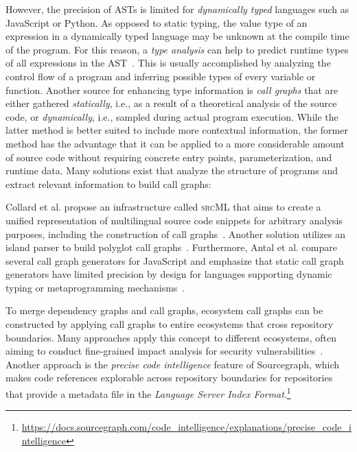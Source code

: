\documentclass[a4paper,twoside]{article}
\newcommand\caps[1]{%
	\textsc{#1}%
}
\begin{document}
However, the precision of ASTs is limited for \emph{dynamically typed} languages such as JavaScript or Python.
As opposed to static typing, the value type of an expression in a dynamically typed language may be unknown at the compile time of the program.
For this reason, a \emph{type analysis} can help to predict runtime types of all expressions in the AST~\cite{jensen2009type}.
This is usually accomplished by analyzing the control flow of a program and inferring possible types of every variable or function.
Another source for enhancing type information is \emph{call graphs} that are either gathered \emph{statically}, i.e., as a result of a theoretical analysis of the source code, or \emph{dynamically}, i.e., sampled during actual program execution.
While the latter method is better suited to include more contextual information, the former method has the advantage that it can be applied to a more considerable amount of source code without requiring concrete entry points, parameterization, and runtime data.
Many solutions exist that analyze the structure of programs and extract relevant information to build call graphs:

Collard et al. propose an infrastructure called \caps{srcML} that aims to create a unified representation of multilingual source code snippets for arbitrary analysis purposes, including the construction of call graphs~\cite{collard2013srcml}.
Another solution utilizes an island parser to build polyglot call graphs~\cite{bogar2018lightweight}.
Furthermore, Antal et al. compare several call graph generators for JavaScript and emphasize that static call graph generators have limited precision by design for languages supporting dynamic typing or metaprogramming mechanisms~\cite{antal2018static}.

To merge dependency graphs and call graphs, ecosystem call graphs can be constructed by applying call graphs to entire ecosystems that cross repository boundaries.
Many approaches apply this concept to different ecosystems, often aiming to conduct fine-grained impact analysis for security vulnerabilities~\cite{hejderup2018software,boldi2020fine,wang2020empirical,hejderup2021praezi,keshani2021scalable,nielsen2021modular}.
Another approach is the \emph{precise code intelligence} feature of Sourcegraph, which makes code references explorable across repository boundaries for repositories that provide a metadata file in the \emph{Language Server Index Format}.\footnote{\url{https://docs.sourcegraph.com/code_intelligence/explanations/precise_code_intelligence}}
\end{document}
